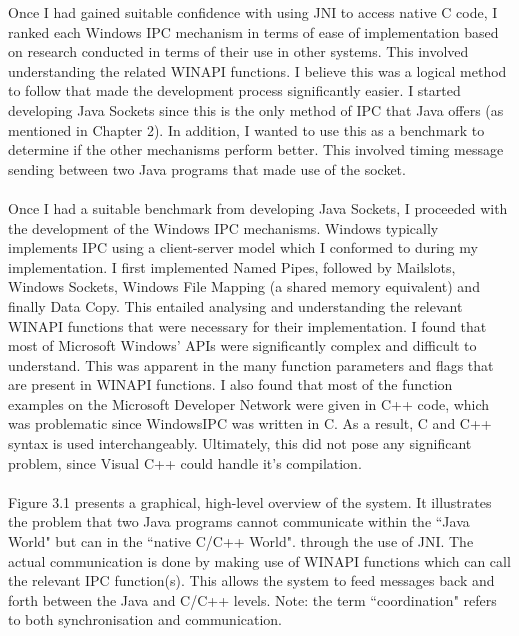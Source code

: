 \documentclass[12pt] {newrucsthesis}    %
\begin{document}
      Once I had gained suitable confidence with using JNI to access native C code,
      I ranked each Windows IPC mechanism in terms of ease of implementation based on research conducted
      in terms of their use in other systems. This involved understanding
      the related WINAPI functions. I believe this was a logical method to follow that made the development
      process significantly easier. I started developing Java Sockets since this is the only method of
      IPC that Java offers (as mentioned in Chapter 2). In addition, I wanted to
      use this as a benchmark to determine if the other mechanisms perform better.
      This involved timing message sending between two Java programs that made use of
      the socket.
      \\\\
      Once I had a suitable benchmark from developing Java Sockets, I proceeded with the development of
      the Windows IPC mechanisms. Windows typically implements IPC using a client-server model which
      I conformed to during my implementation. I first implemented Named Pipes, followed by Mailslots, Windows Sockets,
      Windows File Mapping (a shared memory equivalent) and finally Data Copy. This entailed analysing and understanding the
      relevant WINAPI functions that were necessary for their implementation. I found that most of Microsoft Windows' APIs were significantly
      complex and difficult to understand. This was apparent in the many function parameters and flags that are present
      in WINAPI functions. I also found that most of the function examples on the Microsoft Developer Network were given in C++ code,
      which was problematic since WindowsIPC was written in C. As a result, C and C++ syntax is used interchangeably. Ultimately, this did not
      pose any significant problem, since Visual C++ could handle it's compilation.
      \\\\
      Figure 3.1 presents a graphical, high-level overview of the system. It illustrates the problem that two Java programs cannot
      communicate within the ``Java World" but can in the ``native C/C++ World".
      through the use of JNI. The actual communication is done by making use of
      WINAPI functions which can call the relevant IPC function(s). This
      allows the system to feed messages back and forth between the Java and C/C++ levels.
      Note: the term ``coordination" refers to both synchronisation and communication.
\end{document}
